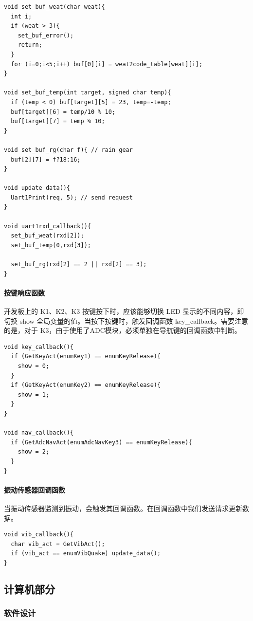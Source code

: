 \documentclass{article}
\begin{document}
\begin{verbatim}
void set_buf_weat(char weat){
  int i;
  if (weat > 3){
    set_buf_error();
    return;
  }
  for (i=0;i<5;i++) buf[0][i] = weat2code_table[weat][i];
}

void set_buf_temp(int target, signed char temp){
  if (temp < 0) buf[target][5] = 23, temp=-temp;
  buf[target][6] = temp/10 % 10;
  buf[target][7] = temp % 10;
}

void set_buf_rg(char f){ // rain gear
  buf[2][7] = f?18:16;
}

void update_data(){
  Uart1Print(req, 5); // send request
}

void uart1rxd_callback(){
  set_buf_weat(rxd[2]);
  set_buf_temp(0,rxd[3]);
  
  set_buf_rg(rxd[2] == 2 || rxd[2] == 3);
}
\end{verbatim}

\paragraph{按键响应函数} 开发板上的 K1、K2、K3 按键按下时，应该能够切换 LED 显示的不同内容，即切换 show 全局变量的值。当按下按键时，触发回调函数 key\_callback。需要注意的是，对于 K3，由于使用了ADC模块，必须单独在导航键的回调函数中判断。

\begin{verbatim}
void key_callback(){
  if (GetKeyAct(enumKey1) == enumKeyRelease){
    show = 0;
  }
  if (GetKeyAct(enumKey2) == enumKeyRelease){
    show = 1;
  }
}

void nav_callback(){
  if (GetAdcNavAct(enumAdcNavKey3) == enumKeyRelease){
    show = 2;
  }
}
\end{verbatim}

\paragraph{振动传感器回调函数} 当振动传感器监测到振动，会触发其回调函数。在回调函数中我们发送请求更新数据。

\begin{verbatim}
void vib_callback(){
  char vib_act = GetVibAct();
  if (vib_act == enumVibQuake) update_data();
}
\end{verbatim}

\subsection{计算机部分}

\subsubsection{软件设计}
\end{document}
